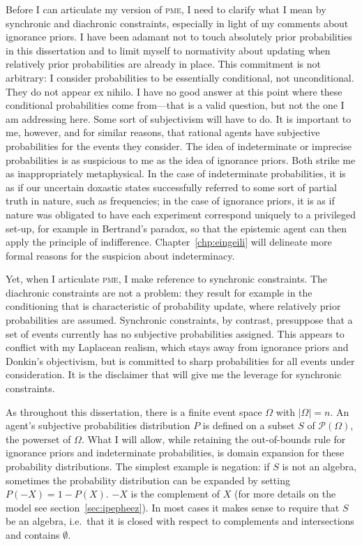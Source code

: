 \documentclass[phd,12pt,oneside]{ubcthesis}
\begin{document}
Before I can articulate my version of \textsc{pme}, I need to clarify
what I mean by synchronic and diachronic constraints, especially in
light of my comments about ignorance priors. I have been adamant not
to touch absolutely prior probabilities in this dissertation and to limit
myself to normativity about updating when relatively prior
probabilities are already in place. This commitment is not arbitrary:
I consider probabilities to be essentially conditional, not
unconditional. They do not appear ex nihilo. I have no good answer at
this point where these conditional probabilities come from---that is a
valid question, but not the one I am addressing here. Some sort of
subjectivism will have to do. It is important to me, however, and for
similar reasons, that rational agents have subjective probabilities
for the events they consider. The idea of indeterminate or imprecise
probabilities is as suspicious to me as the idea of ignorance priors.
Both strike me as inappropriately metaphysical. In the case of
indeterminate probabilities, it is as if our uncertain doxastic states
successfully referred to some sort of partial truth in nature, such as
frequencies; in the case of ignorance priors, it is as if nature was
obligated to have each experiment correspond uniquely to a privileged
set-up, for example in Bertrand's paradox, so that the epistemic agent
can then apply the principle of indifference.
Chapter~\ref{chp:eingeili} will delineate more formal reasons for the
suspicion about indeterminacy.

Yet, when I articulate \textsc{pme}, I make reference to synchronic
constraints. The diachronic constraints are not a problem: they result
for example in the conditioning that is characteristic of probability
update, where relatively prior probabilities are assumed. Synchronic
constraints, by contrast, presuppose that a set of events currently
has no subjective probabilities assigned. This appears to conflict
with my Laplacean realism, which stays away from ignorance priors and
Donkin's objectivism, but is committed to sharp probabilities for all
events under consideration. It is the disclaimer  that will give me the leverage for synchronic
constraints. 

As throughout this dissertation, there is a finite event space $\Omega$ with
$|\Omega|=n$. An agent's subjective probabilities distribution $P$ is
defined on a subset $S$ of $\mathcal{P}(\Omega)$, the powerset of
$\Omega$. What I will allow, while retaining the out-of-bounds rule
for ignorance priors and indeterminate probabilities, is domain
expansion for these probability distributions. The simplest example is
negation: if $S$ is not an algebra, sometimes the probability
distribution can be expanded by setting $P(-X)=1-P(X)$. $-X$ is the
complement of $X$ (for more details on the model see
section~\ref{sec:ipepheez}). In most cases it makes sense to require
that $S$ be an algebra, i.e.\ that it is closed with respect to
complements and intersections and contains $\emptyset$.
\end{document}
